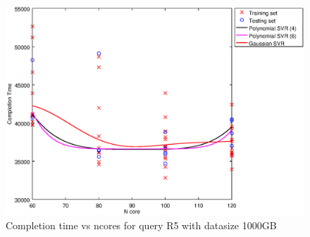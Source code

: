 
\begin {figure}[hbtp]
\centering
\includegraphics[width=\textwidth]{output/R5_1000_ONLY_1_LINEAR_NCORE/plot_R5_1000_bestmodels.eps}
\caption{Completion time vs ncores for query R5 with datasize 1000GB}
\label{fig:only_1_linear_R5_1000}
\end {figure}
